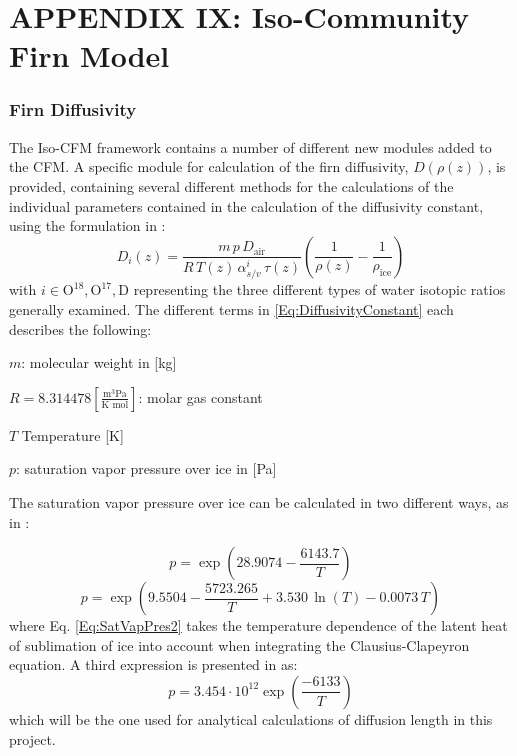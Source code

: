 \documentclass[../../CompleteThesis2/Complete_2ndDraft.tex]{subfiles}
\begin{document}
	\newpage
	\section[Appendix IX: Iso-CFM]{APPENDIX IX: Iso-Community Firn Model}
	\label{AppIX:CFM}
	
	
	\subsubsection[Diffusivity]{Firn Diffusivity}
	\label{Subsubsec:Ice_DiffusionAndDensification_IsoCFM_FirnDiffusivity}
	The Iso-CFM framework contains a number of different new modules added to the CFM. A specific module for calculation of the firn diffusivity, $D(\rho(z))$, is provided, containing several different methods for the calculations of the individual parameters contained in the calculation of the diffusivity constant, using the formulation in \cite[Johnsen et al., 2000]{Johnsen2000}:
	\begin{equation}
		D_i(z) = \frac{m\, p \, D_{\text{air}}}{R \, T(z) \, \alpha^{i}_{s/v}\, \tau(z)}\left(\frac{1}{\rho(z)} - \frac{1}{\rho_{\text{ice}}}\right)
		\label{Eq:DiffusivityConstant}
	\end{equation}
	with $i \in {\text{O}^{18}, \text{O}^{17}, \text{D}}$ representing the three different types of water isotopic ratios generally examined. The different terms in \ref{Eq:DiffusivityConstant} each describes the following:
	
	$m$: molecular weight in [kg]
	
	$R = 8.314478 \left[\frac{\text{m}^3\text{Pa}}{\text{K mol}}\right]$: molar gas constant
	
	$T$ Temperature [K]
	
	$p$: saturation vapor pressure over ice in [Pa]
	
	The saturation vapor pressure over ice can be calculated in two different ways, as in \cite[Murphy \& Koop 2005]{MurphyKoop_2005}:
	
	\begin{equation}
		p = \exp\left(28.9074 - \frac{6143.7}{T}\right)
		\label{Eq:SatVapPres1}
	\end{equation}
	\begin{equation}
		p = \exp\left(9.5504 - \frac{5723.265}{T} + 3.530\, \ln(T) - 0.0073 \, T\right)
		\label{Eq:SatVapPres2}
	\end{equation}
	where Eq. \ref{Eq:SatVapPres2} takes the temperature dependence of the latent heat of sublimation of ice into account when integrating the Clausius-Clapeyron equation.
	A third expression is presented in \cite[Johnsen et al., 2000]{Johnsen2000a} as:
	\begin{equation}
		p = 3.454 \cdot 10^{12} \exp\left(\frac{-6133}{T}\right)
		\label{Eq:SatVapPres3}
	\end{equation}
	which will be the one used for analytical calculations of diffusion length in this project.
	
\end{document}
